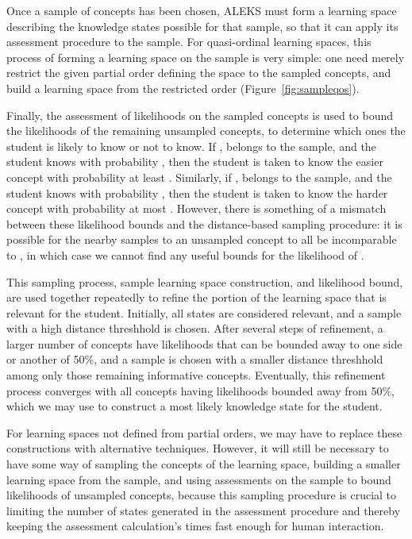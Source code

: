 \documentclass[11pt]{llncs}
\begin{document}
{Once a sample of concepts has been chosen, ALEKS must form a learning space describing the knowledge states possible for that sample, so that it can apply its assessment procedure to the sample.
For quasi-ordinal learning spaces, this process of forming a learning space on the sample is very simple: one need merely restrict the given partial order defining the space to the sampled concepts, and build a learning space from the restricted order (Figure~\ref{fig:sampleqos}).

Finally, the assessment of likelihoods on the sampled concepts is used to bound the likelihoods of the remaining unsampled concepts, to determine which ones the student is likely to know or not to know.
If ,  belongs to the sample, and the student knows  with probability , then the student is taken to know the easier concept  with probability at least . Similarly, if ,  belongs to the sample, and the student knows  with probability , then the student is taken to know the harder concept  with probability at most . However, there is something of a mismatch between these likelihood bounds and the distance-based sampling procedure: it is possible for the nearby samples to an unsampled concept  to all be incomparable to , in which case we cannot find any useful bounds for the likelihood of .

This sampling process, sample learning space construction, and likelihood bound, are used together repeatedly to refine the portion of the learning space that is relevant for the student. Initially, all states are considered relevant, and a sample with a high distance threshhold is chosen. After several steps of refinement, a larger number of concepts have likelihoods that can be bounded away to one side or another of 50\%, and a sample is chosen with a smaller distance threshhold among only those remaining informative concepts. Eventually, this refinement process converges with all concepts having likelihoods bounded away from 50\%, which we may use to construct a most likely knowledge state for the student.

For learning spaces not defined from partial orders, we may have to replace these constructions with alternative techniques. However, it will still be necessary to have some way of sampling the concepts of the learning space, building a smaller learning space from the sample, and using assessments on the sample to bound likelihoods of unsampled concepts, because this sampling procedure is crucial to limiting the number of states generated in the assessment procedure and thereby keeping the assessment calculation's times fast enough for human interaction.

}
\end{document}
